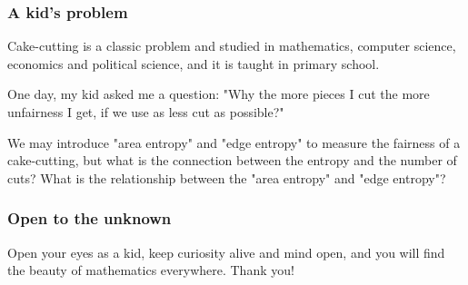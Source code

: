 \documentclass[aspectratio=169]{beamer}
\begin{document}
\begin{frame}
    \frametitle{A kid's problem}
    Cake-cutting is a classic problem and studied in mathematics, computer science, economics and political science,
    and it is taught in primary school.

    One day, my kid asked me a question: "Why the more pieces I cut the more unfairness I get, if we use as less cut as possible?"
    \begin{figure}[ht]\centering
    \end{figure}
    We may introduce "area entropy" and "edge entropy" to measure the fairness of a cake-cutting, but what is the connection between
    the entropy and the number of cuts? What is the relationship between the "area entropy" and "edge entropy"?
\end{frame}

\begin{frame}
    \frametitle{Open to the unknown}
    Open your eyes as a kid, keep curiosity alive and mind open, and you will find the beauty of mathematics everywhere.
    \newline Thank you!
\end{frame}
\end{document}
